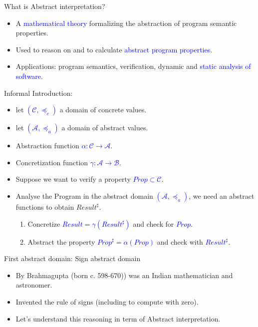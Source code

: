 \begin{frame}{What is Abstract interpretation?}
\begin{itemize}
	\item A \textcolor{blue}{mathematical theory} formalizing the abstraction of program semantic properties.
	\item Used to reason on and to calculate \textcolor{blue}{abstract program properties}.
	\item Applications: program semantics, verification, dynamic and \textcolor{blue}{static analysis of software}.
	\end{itemize}
\end{frame}

\begin{frame}{Informal Introduction:}
\begin{itemize}
	\item let \textcolor{blue}{$(\mathcal{C}, \preceq_c)$} a domain  of concrete values.
	\item let \textcolor{blue}{$(\mathcal{A}, \preceq_a)$} a domain of abstract values.
	\item Abstraction function \textcolor{blue}{$\alpha: \mathcal{C} \rightarrow \mathcal{A}$}.
	\item Concretization function \textcolor{blue}{$\gamma : \mathcal{A} \rightarrow \mathcal{B}$}.
	\item Suppose we want to verify a property \textcolor{blue}{$Prop \subset \mathcal{C}$}.
	\item Analyse the Program in the abstract domain \textcolor{blue}{$(\mathcal{A}, \preceq_a)$}, we need an abstract functions to obtain $Result^\sharp$.
	 \begin{enumerate}
	\item Concretize  \textcolor{blue}{$Result= \gamma(Result^\sharp)$} and check for \textcolor{blue}{$Prop$}.
	\item Abstract the property \textcolor{blue}{$Prop^\sharp = \alpha(Prop)$} and check with \textcolor{blue}{$Result^\sharp$}.
	\end{enumerate}
\end{itemize}
\end{frame}

\begin{frame}{First abstract domain: Sign abstract domain}
\begin{itemize}
	\item By Brahmagupta (born c.  598-670)) was an Indian mathematician and
	astronomer.
	\item Invented the rule of signs (including to compute with zero).
	\item Let's understand this reasoning in term of Abstract interpretation.
\end{itemize}
\end{frame}


